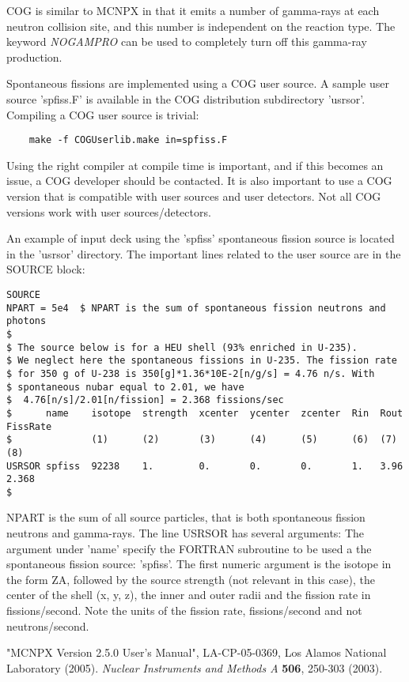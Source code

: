 \documentclass[fleqn,11pt]{article}
\begin{document}
COG is similar to MCNPX in that it emits a number of gamma-rays
at each neutron collision site, and this number is independent
on the reaction type. The keyword \textit{NOGAMPRO} can be used
to completely turn off this gamma-ray production.

Spontaneous fissions are implemented using a COG user source.
A sample user source 'spfiss.F' is available in the COG distribution 
subdirectory 'usrsor'. Compiling a COG user source is trivial:
\begin{verbatim}
	make -f COGUserlib.make in=spfiss.F
\end{verbatim}
Using the right compiler at compile time is important, and if this
becomes an issue, a COG developer should be contacted. It is also 
important to use a COG version that is compatible with user
sources and user detectors. Not all COG versions work with
user sources/detectors.

An example of input deck using the 'spfiss' spontaneous
fission source  is located in the 'usrsor' directory. The important
lines related to the user source are in the SOURCE block:
\begin{verbatim}
SOURCE
NPART = 5e4  $ NPART is the sum of spontaneous fission neutrons and photons
$ 
$ The source below is for a HEU shell (93% enriched in U-235).
$ We neglect here the spontaneous fissions in U-235. The fission rate 
$ for 350 g of U-238 is 350[g]*1.36*10E-2[n/g/s] = 4.76 n/s. With
$ spontaneous nubar equal to 2.01, we have 
$  4.76[n/s]/2.01[n/fission] = 2.368 fissions/sec
$      name    isotope  strength  xcenter  ycenter  zcenter  Rin  Rout  FissRate
$              (1)      (2)       (3)      (4)      (5)      (6)  (7)   (8)
USRSOR spfiss  92238    1.        0.       0.       0.       1.   3.96  2.368
$
\end{verbatim}
NPART is the sum of all source particles, that is both spontaneous
fission neutrons and gamma-rays. The line USRSOR has several arguments:
The argument under 'name' specify the FORTRAN subroutine to be used a 
the spontaneous fission source: 'spfiss'. The first numeric argument is 
the isotope in the form ZA, followed by the source strength (not relevant
in this case), the center of the shell (x, y, z), the inner and outer
radii and the fission rate in fissions/second. Note the units of the
fission rate, fissions/second and not neutrons/second.

\clearpage

\begin{thebibliography}{99}
 "MCNPX Version 2.5.0 User's Manual", LA-CP-05-0369, Los Alamos National Laboratory (2005).
 \textit{Nuclear Instruments and Methods A} \textbf{506}, 250-303 (2003).
\end{thebibliography}
\end{document}

